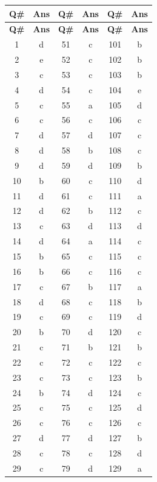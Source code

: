 \documentclass[12pt,letterpaper]{article}
\begin{document}
\begin{center}
\begin{longtable}{|c|c||c|c||c|c|}
\hline
\textbf{Q\#} & \textbf{Ans} & \textbf{Q\#} & \textbf{Ans} & \textbf{Q\#} & \textbf{Ans} \\
\hline
\endfirsthead
\hline
\textbf{Q\#} & \textbf{Ans} & \textbf{Q\#} & \textbf{Ans} & \textbf{Q\#} & \textbf{Ans} \\
\hline
\endhead
1 & d & 51 & c & 101 & b \\
\hline
2 & e & 52 & c & 102 & b \\
\hline
3 & c & 53 & c & 103 & b \\
\hline
4 & d & 54 & c & 104 & e \\
\hline
5 & c & 55 & a & 105 & d \\
\hline
6 & c & 56 & c & 106 & c \\
\hline
7 & d & 57 & d & 107 & c \\
\hline
8 & d & 58 & b & 108 & c \\
\hline
9 & d & 59 & d & 109 & b \\
\hline
10 & b & 60 & c & 110 & d \\
\hline
11 & d & 61 & c & 111 & a \\
\hline
12 & d & 62 & b & 112 & c \\
\hline
13 & c & 63 & d & 113 & d \\
\hline
14 & d & 64 & a & 114 & c \\
\hline
15 & b & 65 & c & 115 & c \\
\hline
16 & b & 66 & c & 116 & c \\
\hline
17 & c & 67 & b & 117 & a \\
\hline
18 & d & 68 & c & 118 & b \\
\hline
19 & c & 69 & c & 119 & d \\
\hline
20 & b & 70 & d & 120 & c \\
\hline
21 & c & 71 & b & 121 & b \\
\hline
22 & c & 72 & c & 122 & c \\
\hline
23 & c & 73 & c & 123 & b \\
\hline
24 & b & 74 & d & 124 & c \\
\hline
25 & c & 75 & c & 125 & d \\
\hline
26 & c & 76 & c & 126 & c \\
\hline
27 & d & 77 & d & 127 & b \\
\hline
28 & c & 78 & c & 128 & d \\
\hline
29 & c & 79 & d & 129 & a \\

\end{longtable}
\end{center}
\end{document}
